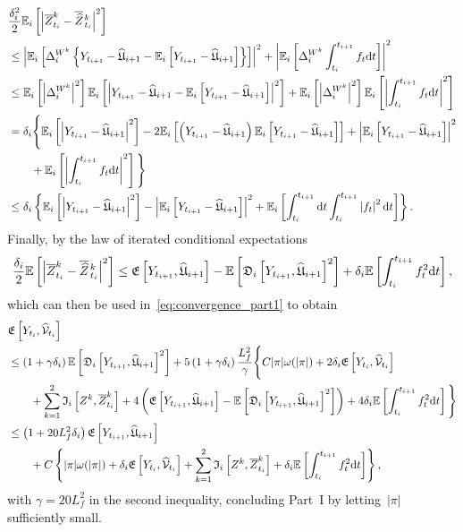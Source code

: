 \begin{align*}
    & \frac{\delta_{i}^2}{2}
    \mathbb{E}_i\left[\left|\overline{Z}^k_{t_i} - \overline{\widehat{Z}}\kern0.1em^{k}_{t_{i}}\right|^2\right] \\
    &\leq \left|\mathbb{E}_i\left[\Delta^{W^k}_{i}\left\{Y_{t_{i+1}}-\widehat{\mathfrak{U}}_{i+1}-\mathbb{E}_i\left[Y_{t_{i+1}} - \widehat{\mathfrak{U}}_{i+1}\right]\right\}\right]\right|^2 + \left|\mathbb{E}_i\left[\Delta^{W^k}_{i} \int_{t_i}^{t_{i+1}} f_{t}\mathrm{d} t\right]\right|^2 \\
    &\leq \mathbb{E}_i\left[\left|\Delta^{W^k}_{i}\right|^2\right] \mathbb{E}_i\left[\left| Y_{t_{i+1}}-\widehat{\mathfrak{U}}_{i+1} - \mathbb{E}_i\left[Y_{t_{i+1}} - \widehat{\mathfrak{U}}_{i+1}\right]\right|^2\right] + \mathbb{E}_i\left[ \left|\Delta^{W^k}_{i}\right|^2\right]\mathbb{E}_i\left[ \left|\int_{t_i}^{t_{i+1}} f_{t}\mathrm{d} t\right|^2\right] \\
    &= \delta_{i} \Bigg\{\mathbb{E}_i\left[\left| Y_{t_{i+1}}-\widehat{\mathfrak{U}}_{i+1}\right|^2\right] -2\mathbb{E}_i\left[\left(Y_{t_{i+1}}-\widehat{\mathfrak{U}}_{i+1}\right)\mathbb{E}_i\left[Y_{t_{i+1}}-\widehat{\mathfrak{U}}_{i+1}\right]\right] + \left|\mathbb{E}_i\left[ Y_{t_{i+1}}-\widehat{\mathfrak{U}}_{i+1}\right]\right|^2 \\
    & \qquad + \mathbb{E}_i\left[ \left|\int_{t_i}^{t_{i+1}} f_{t}\mathrm{d} t\right|^2\right]\Bigg\} \\
    &\leq \delta_{i} \left\{\mathbb{E}_i\left[\left| Y_{t_{i+1}}-\widehat{\mathfrak{U}}_{i+1}\right|^2\right] - \left|\mathbb{E}_i\left[ Y_{t_{i+1}}-\widehat{\mathfrak{U}}_{i+1}\right]\right|^2 + \mathbb{E}_i\left[\int_{t_i}^{t_{i+1}}\mathrm{d} t  \int_{t_i}^{t_{i+1}} \left| f_{t}\right|^2\mathrm{d} t\right]\right\}.
\end{align*}
Finally, by the law of iterated conditional expectations
\begin{equation}\label{eq:convergence_part1_2}
\frac{\delta_{i}}{2}
\mathbb{E}\left[\left|\overline{Z}^k_{t_i} - \overline{\widehat{Z}}\kern0.1em^{k}_{t_{i}}\right|^2\right]
\leq \mathfrak{E}\left[Y_{t_{i+1}}, \widehat{\mathfrak{U}}_{i+1}\right]
- \mathbb{E}\left[\mathfrak{D}_i\left[Y_{t_{i+1}}, \widehat{\mathfrak{U}}_{i+1}\right]^{2}\right]
 + \delta_{i}  \mathbb{E}\left[\int_{t_i}^{t_{i+1}}
f_{t}^2 \mathrm{d} t\right],
\end{equation}
which can then be used in~\eqref{eq:convergence_part1} to obtain
\begin{align}
\begin{split}
& \mathfrak{E}\left[Y_{t_i}, \widehat{\mathcal{V}}_{t_i}\right] \\
& \leq\left(1+\gamma \delta_{i} \right) \mathbb{E}\left[\mathfrak{D}_i\left[Y_{t_{i+1}}, \widehat{\mathfrak{U}}_{i+1}\right]^2\right] 
 + 5\left(1+\gamma \delta_{i} \right) \frac{L_f^2}{\gamma}\Bigg\{C |\pi| \omega(|\pi|) + 2\delta_{i}  \mathfrak{E}\left[Y_{t_i}, \widehat{\mathcal{V}}_{t_i}\right] \\
&\qquad +\sum_{k=1}^2\mathfrak{I}_i\left[Z^k, \overline{Z}^{k}_{t_i}\right] + 4\left(\mathfrak{E}\left[Y_{t_{i+1}}, \widehat{\mathfrak{U}}_{i+1}\right] - \mathbb{E}\left[\mathfrak{D}_i\left[Y_{t_{i+1}}, \widehat{\mathfrak{U}}_{i+1}\right]^{2}\right]\right)
 + 4 \delta_{i}  \mathbb{E}\left[\int_{t_i}^{t_{i+1}}f_{t}^2 \mathrm{d} t\right]\Bigg\} \\
& \leq \left(1+20 L_f^2 \delta_{i} \right) \mathfrak{E}\left[Y_{t_{i+1}}, \widehat{\mathfrak{U}}_{i+1}\right] \\
& \qquad + C \left\{|\pi| \omega(|\pi|) + \delta_{i} \mathfrak{E}\left[Y_{t_i}, \widehat{\mathcal{V}}_{t_i}\right] + \sum_{k=1}^{2}\mathfrak{I}_i\left[Z^k, \overline{Z}^{k}_{t_i}\right]  + \delta_{i}  \mathbb{E}\left[\int_{t_i}^{t_{i+1}}f_{t}^2 \mathrm{d} t\right]\right\},
\end{split}
\end{align}
with $\gamma = 20 L_f^2$ in the second inequality, concluding Part~I by letting~$|\pi|$ sufficiently small.

